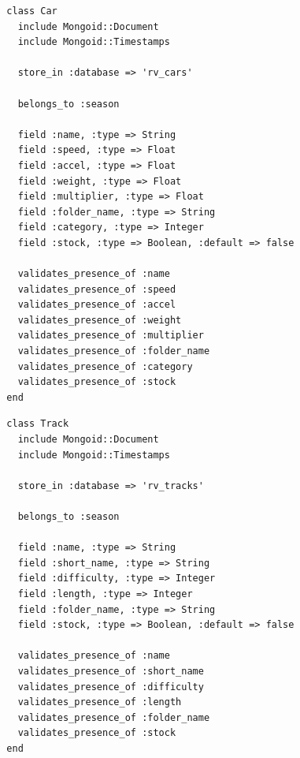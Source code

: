 \begin{listing}
  \begin{verbatim}
  class Car
    include Mongoid::Document
    include Mongoid::Timestamps
    
    store_in :database => 'rv_cars'
    
    belongs_to :season
    
    field :name, :type => String
    field :speed, :type => Float
    field :accel, :type => Float
    field :weight, :type => Float
    field :multiplier, :type => Float
    field :folder_name, :type => String
    field :category, :type => Integer
    field :stock, :type => Boolean, :default => false
    
    validates_presence_of :name
    validates_presence_of :speed
    validates_presence_of :accel
    validates_presence_of :weight
    validates_presence_of :multiplier
    validates_presence_of :folder_name
    validates_presence_of :category
    validates_presence_of :stock
  end
  \end{verbatim}
\end{listing}

\begin{listing}
  \begin{verbatim}
  class Track
    include Mongoid::Document
    include Mongoid::Timestamps
    
    store_in :database => 'rv_tracks'
    
    belongs_to :season
    
    field :name, :type => String
    field :short_name, :type => String
    field :difficulty, :type => Integer
    field :length, :type => Integer
    field :folder_name, :type => String
    field :stock, :type => Boolean, :default => false
    
    validates_presence_of :name
    validates_presence_of :short_name
    validates_presence_of :difficulty
    validates_presence_of :length
    validates_presence_of :folder_name
    validates_presence_of :stock
  end
  \end{verbatim}
\end{listing}

